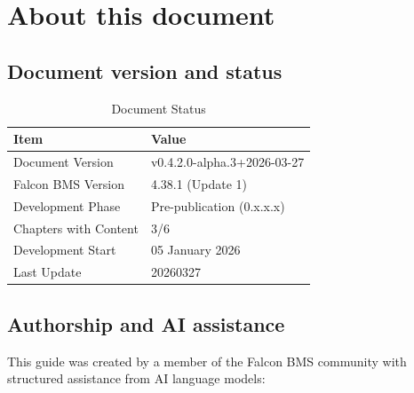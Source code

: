 \documentclass[11pt, a4paper, twoside]{report}
\newcommand{\docversion}{v0.4.2.0-alpha.3}
\newcommand{\docbuild}{2026-03-27}
\newcommand{\docstartdate}{05 January 2026}
\newcommand{\docenddate}{20260327}
\newcommand{\chapterscompletedof}{3/6}
\newcommand{\fulldocversion}{\docversion+\docbuild}
\begin{document}
\section{About this document}
\label{sec:C1-S4}

\subsection{Document version and status}
\label{sec:C1-S4-S1}

\begin{table}[H]
	\centering
	\caption{Document Status}
	\label{tab:C1-doc-status}
	\small
	\renewcommand{\arraystretch}{1.25}
	\begin{tabular}{L{4.5cm} L{9.0cm}}
		\toprule
		\textbf{Item} & \textbf{Value} \\
		\midrule
		Document Version & \fulldocversion \\
		Falcon BMS Version & 4.38.1 (Update 1) \\
		Development Phase & Pre-publication (0.x.x.x) \\
		Chapters with Content & \chapterscompletedof \\
		Development Start & \docstartdate \\
		Last Update & \docenddate \\
		\bottomrule
	\end{tabular}
\end{table}

\subsection{Authorship and AI assistance}
\label{sec:C1-S4-S2}

This guide was created by a member of the Falcon BMS community with structured assistance from AI language models:
\end{document}
